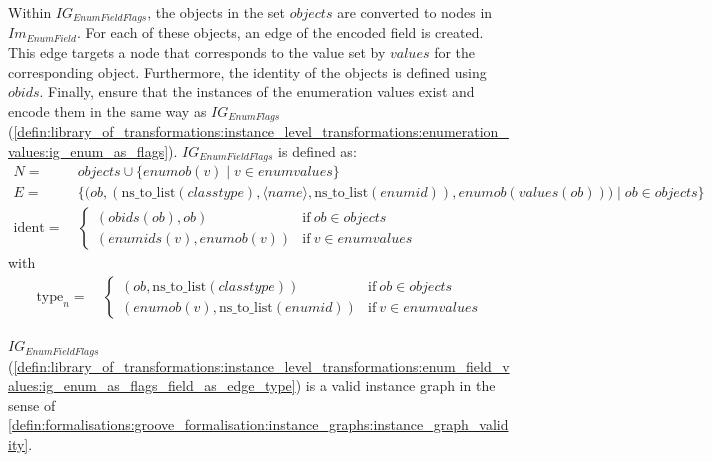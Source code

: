 \begin{defin}
Within $IG_{EnumFieldFlags}$, the objects in the set $objects$ are converted to nodes in $Im_{EnumField}$. For each of these objects, an edge of the encoded field is created. This edge targets a node that corresponds to the value set by $values$ for the corresponding object. Furthermore, the identity of the objects is defined using $obids$. Finally, ensure that the instances of the enumeration values exist and encode them in the same way as $IG_{EnumFlags}$ (\cref{defin:library_of_transformations:instance_level_transformations:enumeration_values:ig_enum_as_flags}). $IG_{EnumFieldFlags}$ is defined as:
\begin{align*}
N =\ & objects \cup \{enumob(v) \mid v \in enumvalues \} \\
E =\ & \big\{\big(ob, (\mathrm{ns\_\!to\_\!list}(classtype), \langle name \rangle, \mathrm{ns\_\!to\_\!list}(enumid)), enumob(values(ob))\big) \mid ob \in objects \big\} \\
\mathrm{ident} =\ & \begin{cases}
    (obids(ob), ob) & \mathrm{if }\ ob \in objects\\
    (enumids(v), enumob(v)) & \mathrm{if }\ v \in enumvalues
\end{cases}
\end{align*}
with
\begin{align*}
\mathrm{type}_n =\ & \begin{cases}
    (ob, \mathrm{ns\_\!to\_\!list}(classtype)) & \mathrm{if }\ ob \in objects\\
    (enumob(v), \mathrm{ns\_\!to\_\!list}(enumid)) & \mathrm{if }\ v \in enumvalues
\end{cases}
\end{align*}
\end{defin}

\begin{thm}
\label{defin:library_of_transformations:instance_level_transformations:enum_field_values:ig_enum_as_flags_field_as_edge_type_correct}
$IG_{EnumFieldFlags}$ (\cref{defin:library_of_transformations:instance_level_transformations:enum_field_values:ig_enum_as_flags_field_as_edge_type}) is a valid instance graph in the sense of \cref{defin:formalisations:groove_formalisation:instance_graphs:instance_graph_validity}.
\end{thm}

